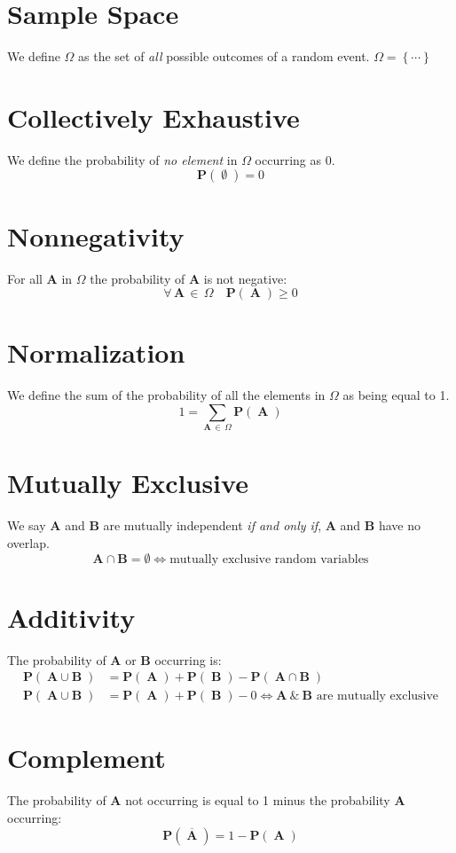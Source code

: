 \documentclass{article}
\newcommand{\Parens}[1]{\ensuremath{\left(\;#1\;\right)}\xspace}
\newcommand{\Prob}[1]{\ensuremath{\mathbf{P}\Parens{#1}}\xspace}
\newcommand{\RandVar}[1]{\ensuremath{\mathbf{#1}}\xspace}
\begin{document}
\section*{Sample Space}
We define $\Omega$ as the set of \emph{all} possible outcomes of a random event. $\Omega = \left\{ \cdots \right\}$

\section*{Collectively Exhaustive}
We define the probability of \emph{no element} in $\Omega$ occurring as $0$. 
$$\Prob{\emptyset} = 0$$

\section*{Nonnegativity}
For all $\RandVar{A}$ in $\Omega$ the probability of \RandVar{A} is not negative:
$$\forall\,\RandVar{A}\,\in\,\Omega\quad\Prob{\RandVar{A}} \ge 0$$

\section*{Normalization}
We define the sum of the probability of all the elements in $\Omega$ as being equal to 1.
$$1 = \sum\limits_{\RandVar{A}\,\in\,\Omega} \Prob{\RandVar{A}}$$

\section*{Mutually Exclusive}
We say \RandVar{A} and \RandVar{B} are mutually independent \emph{if and only if},  \RandVar{A} and \RandVar{B} have no overlap.
$$\RandVar{A} \cap \RandVar{B} = \emptyset \iff \text{mutually exclusive random variables}$$

\section*{Additivity}
The probability of \RandVar{A} or \RandVar{B} occurring is:
\begin{align*}
\Prob{\RandVar{A} \cup \RandVar{B}} &= \Prob{\RandVar{A}} + \Prob{\RandVar{B}} - \Prob{\RandVar{A} \cap \RandVar{B}}\\
\Prob{\RandVar{A} \cup \RandVar{B}} &= \Prob{\RandVar{A}} + \Prob{\RandVar{B}} - 0 \iff \RandVar{A}~\&~\RandVar{B} \text{~are mutually exclusive}
\end{align*}

\section*{Complement}
The probability of \RandVar{A} not occurring is equal to 1 minus the probability \RandVar{A} occurring:
$$\Prob{\overline{\RandVar{A}}} = 1 - \Prob{\RandVar{A}}$$
\end{document}
